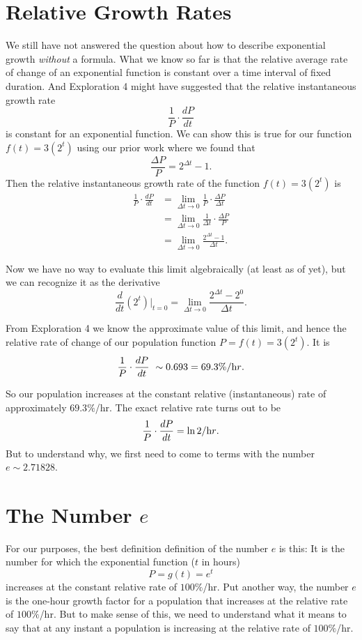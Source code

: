 \documentclass{ximera}
\begin{document}
\section{Relative Growth Rates}
We still have not answered the question about how to describe exponential growth \emph{without} a formula. What we know so far is that the relative average rate of change of an exponential function is constant over a time interval of fixed duration.  And Exploration 4 might have suggested that the relative instantaneous growth rate 
\[
  \frac{1}{P}\cdot \frac{dP}{dt}
\]
is constant for an exponential function. We can show this is true for our function $f(t)=3(2^t)$ using our prior work where we found that 
\[
  \frac{\Delta P}{P} = 2^{\Delta t} - 1 .
\]
Then the relative instantaneous growth rate of the function $f(t)=3(2^t)$ is 
\begin{align*}
      \frac{1}{P}\cdot \frac{dP}{dt} &= \lim_{\Delta t\to  0} \frac{1}{P} \cdot \frac{\Delta P}{\Delta t} \\
                                                   &= \lim_{\Delta t\to  0} \frac{1}{\Delta t} \cdot \frac{\Delta P}{P} \\
                                                   &=  \lim_{\Delta t\to  0}  \frac{2^{\Delta t} - 1}{\Delta t} .
\end{align*}

Now we have no way to evaluate this limit algebraically (at least as of yet), but we can recognize it as the derivative
\[
     \frac{d}{dt}\left ( 2^ t \right) \Big|_{t=0} = \lim_{\Delta t\to  0}  \frac{2^{\Delta t} - 2^0}{\Delta t} .
\]

From Exploration 4 we know the approximate value of this limit, and hence the relative rate of change of our population function $P = f(t) = 3(2^t)$. It is
\[
        \frac{1}{P}\cdot \frac{dP}{dt} ~\sim 0.693 = 69.3\% / {\text hr}.
\]

So our population increases at the constant relative (instantaneous) rate of approximately $69.3\%$/hr. The exact relative rate turns out to be
\[
  \frac{1}{P}\cdot \frac{dP}{dt} = \ln 2 / {\text hr}.
\]
But to understand why, we first need to come to terms with the number $e\sim 2.71828$.


\section{The Number $e$}

For our purposes, the best definition definition of the number $e$ is this: It is the number for which the exponential function ($t$ in hours)
\[
     P = g(t) = e^t 
\]
increases at the constant relative rate of $100\%$/hr. Put another way, the number $e$ is the one-hour growth factor for a population that increases at the relative rate of $100\%$/hr. But to make sense of this, we need to understand what it means to say that at any instant a population is increasing at the relative rate of $100\%$/hr.
\end{document}
